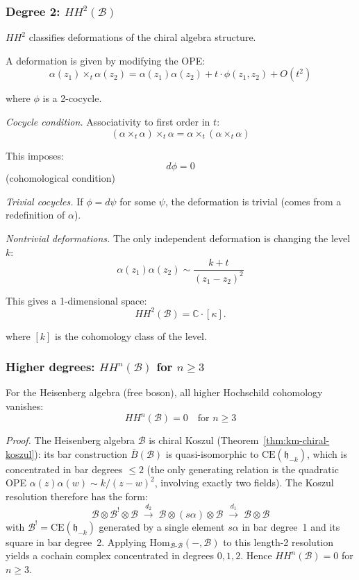 \begin{example}
\subsubsection{\texorpdfstring{Degree 2: $HH^2(\mathcal{B})$}{Degree 2: HH 2(B)}}

$HH^2$ classifies deformations of the chiral algebra structure.

A deformation is given by modifying the OPE:
\[\alpha(z_1) \times_t \alpha(z_2) = \alpha(z_1)\alpha(z_2) + t \cdot \phi(z_1, z_2) + O(t^2)\]

where $\phi$ is a 2-cocycle.

\emph{Cocycle condition.} Associativity to first order in $t$:
\[(\alpha \times_t \alpha) \times_t \alpha = \alpha \times_t (\alpha \times_t \alpha)\]

This imposes:
\[d\phi = 0\]
(cohomological condition)

\emph{Trivial cocycles.} If $\phi = d\psi$ for some $\psi$, the deformation is trivial
(comes from a redefinition of $\alpha$).

\emph{Nontrivial deformations.} The only independent deformation is changing the level $k$:
\[\alpha(z_1)\alpha(z_2) \sim \frac{k + t}{(z_1-z_2)^2}\]

This gives a 1-dimensional space:
\[HH^2(\mathcal{B}) = \mathbb{C} \cdot [\kappa].\]

where $[k]$ is the cohomology class of the level.

\subsubsection{\texorpdfstring{Higher degrees: $HH^n(\mathcal{B})$ for $n \geq 3$}{Higher degrees: HH n(B) for n >= 3}}

For the Heisenberg algebra (free boson), all higher Hochschild cohomology vanishes:
\[HH^n(\mathcal{B}) = 0 \quad \text{for } n \geq 3\]

\emph{Proof.} The Heisenberg algebra $\mathcal{B}$ is chiral Koszul (Theorem~\ref{thm:km-chiral-koszul}): its bar construction $\bar{B}(\mathcal{B})$ is quasi-isomorphic to $\mathrm{CE}(\mathfrak{h}_{-k})$, which is concentrated in bar degrees $\leq 2$ (the only generating relation is the quadratic OPE $\alpha(z)\alpha(w) \sim k/(z-w)^2$, involving exactly two fields).  The Koszul resolution therefore has the form:
\[\mathcal{B} \otimes \mathcal{B}^! \otimes \mathcal{B} \;\xrightarrow{d_2}\; \mathcal{B} \otimes (s\alpha) \otimes \mathcal{B} \;\xrightarrow{d_1}\; \mathcal{B} \otimes \mathcal{B}\]
with $\mathcal{B}^! = \mathrm{CE}(\mathfrak{h}_{-k})$ generated by a single element $s\alpha$ in bar degree~1 and its square in bar degree~2.  Applying $\mathrm{Hom}_{\mathcal{B}\text{-}\mathcal{B}}(-, \mathcal{B})$ to this length-2 resolution yields a cochain complex concentrated in degrees $0, 1, 2$.  Hence $HH^n(\mathcal{B}) = 0$ for $n \geq 3$.


\end{example}
